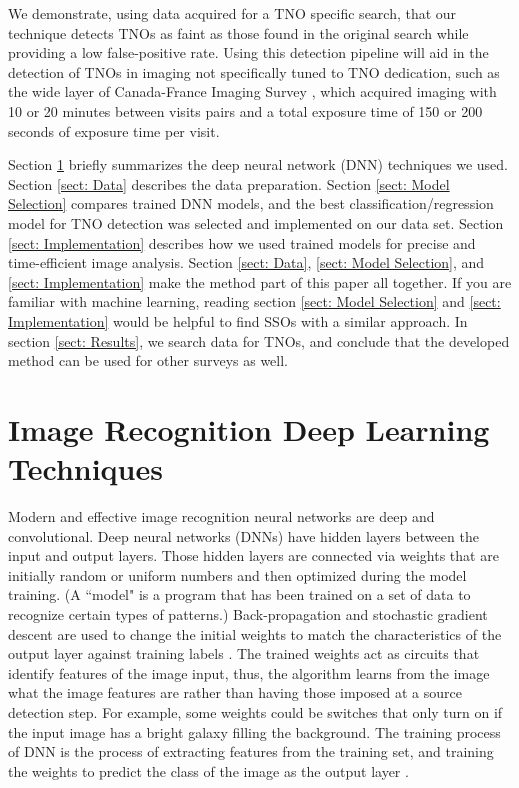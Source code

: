 We demonstrate, using data acquired for a TNO specific search, that our technique detects TNOs as faint as those found in the original search while providing a low false-positive rate.
Using this detection pipeline will aid in the detection of TNOs in imaging not specifically tuned to TNO dedication, such as the wide layer of Canada-France Imaging Survey \citep{2017ApJ...848..128I}, which acquired imaging with 10 or 20 minutes between visits pairs and a total exposure time of 150 or 200 seconds of exposure time per visit.

Section \ref{sect: Techniques} briefly summarizes the deep neural network (DNN) techniques we used.
Section \ref{sect: Data} describes the data preparation.
Section \ref{sect: Model Selection} compares trained DNN models, and the best classification/regression model for TNO detection was selected and implemented on our data set.
Section \ref{sect: Implementation} describes how we used trained models for precise and time-efficient image analysis.
Section \ref{sect: Data}, \ref{sect: Model Selection}, and \ref{sect: Implementation} make the method part of this paper all together.
If you are familiar with machine learning, reading section \ref{sect: Model Selection} and \ref{sect: Implementation} would be helpful to find SSOs with a similar approach.
In section \ref{sect: Results}, we search data for TNOs, and conclude that the developed method can be used for other surveys as well.

\section{Image Recognition Deep Learning Techniques}
\label{sect: Techniques}
Modern and effective image recognition neural networks are deep and convolutional. 
Deep neural networks (DNNs) have hidden layers between the input and output layers.
Those hidden layers are connected via weights that are initially random or uniform numbers and then optimized during the model training. 
(A ``model" is a program that has been trained on a set of data to recognize certain types of patterns.)
Back-propagation and stochastic gradient descent are used to change the initial weights to match the characteristics of the output layer against training labels \citep{lecun1988theoretical, bottou2012stochastic}.
The trained weights act as circuits that identify features of the image input, thus, the algorithm learns from the image what the image features are rather than having those imposed at a source detection step. 
For example, some weights could be switches that only turn on if the input image has a bright galaxy filling the background. 
The training process of DNN is the process of extracting features from the training set, and training the weights to predict the class of the image as the output layer \citep{fukushima1983neocognitron}.

